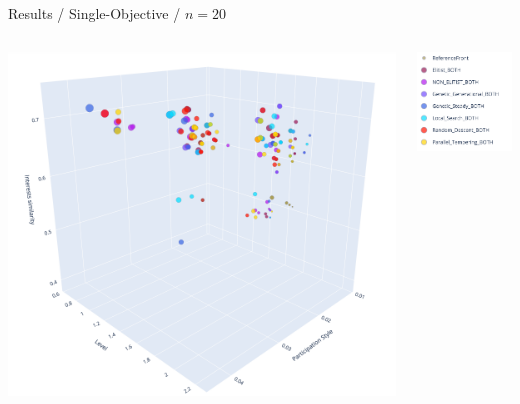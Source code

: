 \documentclass{beamer}
\begin{document}
    
    \begin{frame}{Results / Single-Objective / $n=20$}
            \begin{columns}
                \begin{column}{0.70\textwidth}
                    \includegraphics[width=\textwidth]{images/20_single.png}
                \end{column}
                \begin{column}{0.30\textwidth}
                    \includegraphics[width=\textwidth]{images/legend_single.png}
                \end{column}
            \end{columns}\\
    \end{frame}
    
\end{document}
